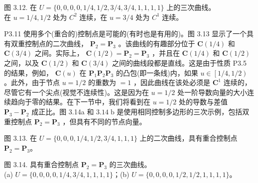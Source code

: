 \documentclass[../main.tex]{subfiles}
\begin{document}
\begin{center}
\begin{minipage}{18cm}
\vspace*{.6\baselineskip}
\centering
{}
\par\smallskip
图 3.12. 在 \(U=\{0,0,0,0,1/4,1/2,3/4,3/4,1,1,1,1\}\) 上的三次曲线。\\ 在 \(u=1/4,1/2\) 处为 \(C^2\) 连续，在 \(u=3/4\) 处为 \(C^1\) 连续。
\end{minipage}
\end{center}

P3.11 使用多个(重合的)控制点是可能的(有时也是有用的)。图 3.13 显示了一个具有双重控制点的二次曲线， \({\mathbf{P}}_{2} = {\mathbf{P}}_{3}\) 。该曲线的有趣部分位于 \(\mathbf{C}\left( {1/4}\right)\) 和 \(\mathbf{C}\left( {3/4}\right)\) 之间。实际上， \(\mathbf{C}\left( {1/2}\right)  = {\mathbf{P}}_{2} = {\mathbf{P}}_{3}\) ，并且在 \(\mathbf{C}\left( {1/4}\right)\) 和 \(\mathbf{C}\left( {1/2}\right)\) 之间，以及 \(\mathbf{C}\left( {1/2}\right)\) 和 \(\mathbf{C}\left( {3/4}\right)\) 之间的曲线段都是直线。这是由于性质 P3.5 的结果，例如， \(\mathbf{C}\left( u\right)\) 在 \({\mathbf{P}}_{1}{\mathbf{P}}_{2}{\mathbf{P}}_{3}\) 的凸包(即一条线)内，如果 \(u \in  \left\lbrack  {1/4,1/2}\right)\) 。此外，由于节点 \(u = 1/2\) 的重数为 \(= 1\) ，因此曲线在该处必须是 \({\mathbf{C}}^{1}\) 连续的，尽管它有一个尖点(视觉不连续性)。这是因为在 \(u = 1/2\) 处一阶导数向量的大小连续趋向于零的结果。在下一节中，我们将看到在 \(u = 1/2\) 处的导数与差值 \({\mathbf{P}}_{3} - {\mathbf{P}}_{2}\) 成正比。图 3.14a 和 \({3.14}\mathrm{\;b}\) 是使用相同控制多边形的三次示例，包括双重控制点 \({\mathbf{P}}_{2} = {\mathbf{P}}_{3}\) ，但具有不同的节点向量。









\begin{center}
\begin{minipage}{18cm}
\vspace*{.6\baselineskip}
\centering
{}
\par\smallskip
图 3.13. 在 \(U=\{0,0,0,1/4,1/2,3/4,1,1,1\}\) 上的二次曲线，具有重合控制点 \(\mathbf P_2=\mathbf P_3\)。
\end{minipage}
\end{center}

\begin{center}
\begin{minipage}{18cm}
\vspace*{.6\baselineskip}
\centering
{}
\par\smallskip
图 3.14. 具有重合控制点 \(\mathbf P_2=\mathbf P_3\) 的三次曲线。\\ (a) \(U=\{0,0,0,0,1/4,3/4,1,1,1,1\}\)；(b) \(U=\{0,0,0,0,1/2,1/2,1,1,1,1\}\)。
\end{minipage}
\end{center}
\end{document}
